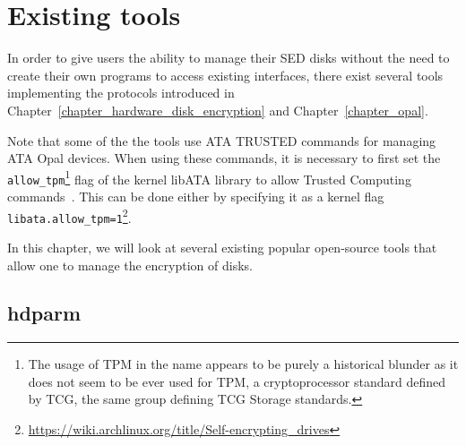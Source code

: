 
\chapter{Existing tools}
\label{chapter_tools}

In order to give users the ability to manage their SED disks without the need to create their own programs to access existing interfaces, there exist several tools implementing the protocols introduced in Chapter~\ref{chapter_hardware_disk_encryption} and Chapter~\ref{chapter_opal}. 

Note that some of the the tools use ATA TRUSTED commands for managing ATA Opal devices. When using these commands, it is necessary to first set the \verb|allow_tpm|\footnote{The usage of TPM in the name appears to be purely a historical blunder as it does not seem to be ever used for TPM, a cryptoprocessor standard defined by TCG, the same group defining TCG Storage standards.} flag of the kernel libATA library to allow Trusted Computing commands~\cite{acs-3}. This can be done either by specifying it as a kernel flag \verb|libata.allow_tpm=1|\footnote{\url{https://wiki.archlinux.org/title/Self-encrypting_drives}}.

In this chapter, we will look at several existing popular open-source tools that allow one to manage the encryption of disks.



\section{hdparm}
 
